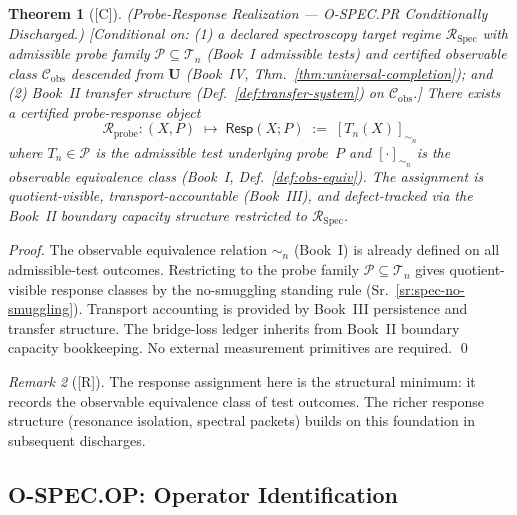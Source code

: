 \documentclass[12pt,oneside]{amsbook}
\theoremstyle{plain}
\newtheorem{theorem}{Theorem}[section]
\theoremstyle{definition}
\theoremstyle{remark}
\newtheorem{remark}[theorem]{Remark}
\newcommand{\status}[1]{\textup{[#1]}}
\begin{document}
\begin{theorem}[\status{C}]\label{thm:spec-PR-discharged}
\textup{(Probe-Response Realization --- O-SPEC.PR Conditionally Discharged.)}
\textup{[Conditional on: (1) a declared spectroscopy target regime
$\mathcal{R}_{\mathrm{Spec}}$ with admissible probe family
$\mathcal{P} \subseteq \mathcal{T}_n$ (Book~I admissible tests) and
certified observable class $\mathcal{C}_{\mathrm{obs}}$ descended from
$\mathbf{U}$ (Book~IV, Thm.~\ref{thm:universal-completion}); and (2)
Book~II transfer structure
(Def.~\ref{def:transfer-system}) on $\mathcal{C}_{\mathrm{obs}}$.]}
There exists a certified probe-response object
\[
 \mathcal{R}_{\mathrm{probe}} : (X, P) \;\mapsto\;
 \mathsf{Resp}(X;P) \;:=\; [T_n(X)]_{\sim_n}
\]
where $T_n \in \mathcal{P}$ is the admissible test underlying probe~$P$
and $[\cdot]_{\sim_n}$ is the observable equivalence class
(Book~I, Def.~\ref{def:obs-equiv}). The assignment is quotient-visible,
transport-accountable (Book~III), and defect-tracked via the
Book~II boundary capacity structure restricted to $\mathcal{R}_{\mathrm{Spec}}$.
\end{theorem}

\begin{proof}
The observable equivalence relation $\sim_n$ (Book~I) is already defined
on all admissible-test outcomes. Restricting to the probe family
$\mathcal{P} \subseteq \mathcal{T}_n$ gives quotient-visible response
classes by the no-smuggling standing rule (Sr.~\ref{sr:spec-no-smuggling}).
Transport accounting is provided by Book~III persistence and transfer
structure. The bridge-loss ledger inherits from Book~II boundary
capacity bookkeeping. No external measurement primitives are required.
\qed
\end{proof}

\begin{remark}[\status{R}]\label{rem:spec-PR-scope}
The response assignment here is the structural minimum: it records the
observable equivalence class of test outcomes. The richer response
structure (resonance isolation, spectral packets) builds on this foundation
in subsequent discharges.
\end{remark}

\subsection{O-SPEC.OP: Operator Identification}\label{sec:spec-OP}
\end{document}
